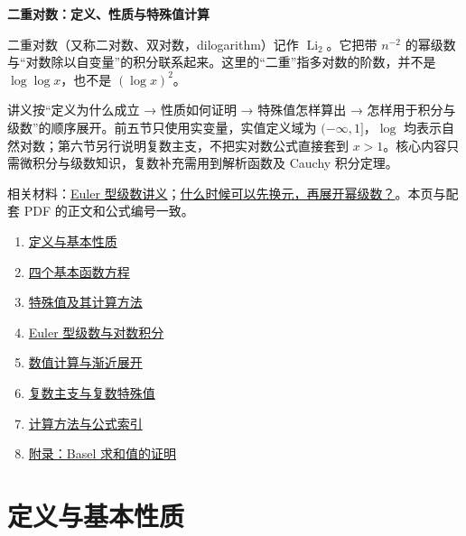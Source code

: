 \documentclass[11pt,a4paper]{article}
\providecommand{\tightlist}{\setlength{\itemsep}{3pt}\setlength{\parskip}{0pt}}
\begin{document}
\begin{center}
{\LARGE\bfseries 二重对数：定义、性质与特殊值计算\par}
\end{center}
\vspace{10pt}
二重对数（又称二对数、双对数，dilogarithm）记作
\(\operatorname{Li}_2\)。它把带 \(n^{-2}\)
的幂级数与``对数除以自变量''的积分联系起来。这里的``二重''指多对数的阶数，并不是
\(\log\log x\)，也不是 \((\log x)^2\)。

讲义按``定义为什么成立 → 性质如何证明 → 特殊值怎样算出 →
怎样用于积分与级数''的顺序展开。前五节只使用实变量，实值定义域为
\((-\infty,1]\)，\(\log\)
均表示自然对数；第六节另行说明复数主支，不把实对数公式直接套到
\(x>1\)。核心内容只需微积分与级数知识，复数补充需用到解析函数及 Cauchy
积分定理。

相关材料：\href{https://zj139.github.io/math-notes/notes/890e1516e64e21a2fb2248b4/}{Euler
型级数讲义}；\href{https://zj139.github.io/math-notes/essays/e171823ae7848bf83c108276/}{什么时候可以先换元，再展开幂级数？}。本页与配套
PDF 的正文和公式编号一致。

\begin{enumerate}
\def\labelenumi{\arabic{enumi}.}
\tightlist
\item
  \protect\hyperlink{ux5b9aux4e49ux4e0eux57faux672cux6027ux8d28}{定义与基本性质}
\item
  \protect\hyperlink{ux56dbux4e2aux57faux672cux51fdux6570ux65b9ux7a0b}{四个基本函数方程}
\item
  \protect\hyperlink{ux7279ux6b8aux503cux53caux5176ux8ba1ux7b97ux65b9ux6cd5}{特殊值及其计算方法}
\item
  \protect\hyperlink{euler-ux578bux7ea7ux6570ux4e0eux5bf9ux6570ux79efux5206}{Euler
  型级数与对数积分}
\item
  \protect\hyperlink{ux6570ux503cux8ba1ux7b97ux4e0eux6e10ux8fd1ux5c55ux5f00}{数值计算与渐近展开}
\item
  \protect\hyperlink{ux590dux6570ux4e3bux652fux4e0eux590dux6570ux7279ux6b8aux503c}{复数主支与复数特殊值}
\item
  \protect\hyperlink{ux8ba1ux7b97ux65b9ux6cd5ux4e0eux516cux5f0fux7d22ux5f15}{计算方法与公式索引}
\item
  \protect\hyperlink{ux9644ux5f55basel-ux6c42ux548cux503cux7684ux8bc1ux660e}{附录：Basel
  求和值的证明}
\end{enumerate}

\hypertarget{ux5b9aux4e49ux4e0eux57faux672cux6027ux8d28}{%
\section{定义与基本性质}\label{ux5b9aux4e49ux4e0eux57faux672cux6027ux8d28}}
\end{document}
